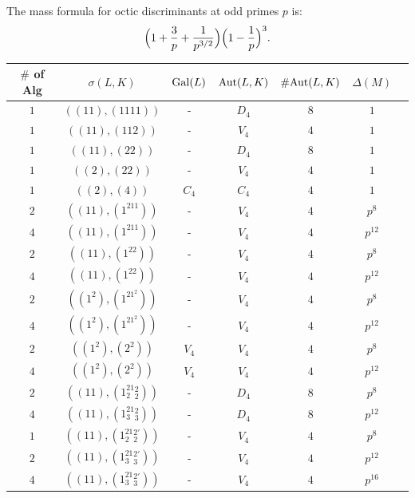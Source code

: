 \documentclass[10pt]{article}
\theoremstyle{plain}
\theoremstyle{definition}
\theoremstyle{remark}
\DeclareMathOperator{\Aut}{Aut}
\def\Gal{{\rm Gal}}
\def\Aut{{\rm Aut}}
\begin{document}
The mass formula for
octic discriminants at odd primes $p$
is:
\begin{equation*}
\Bigl(1+\frac{3}{p}+\frac{1}{p^{3/2}}\Bigr)\Bigl(1-\frac{1}{p}\Bigr)^3.
\end{equation*}
\begin{table}
\centering
\begin{tabular}{|c|c|c|c|c|c|c|}
\hline
$\#$ of Alg & $\sigma(L,K)$ & $\Gal(L)$ &  $\Aut(L,K)$ &
$\#\Aut(L,K)$ & $\Delta(M)$ \\
\hline
$1$ & $((11),(1111))$ & -   &  $D_4$  & $8$ & $1$ \\
$1$ & $((11),(112))$  & -   &  $V_4$  & $4$ & $1$ \\
$1$ & $((11),(22))$   & -   &  $D_4$  & $8$ & $1$ \\
$1$ & $((2),(22))$    & -   &  $V_4$  & $4$ & $1$ \\
$1$ & $((2),(4))$     & $C_4$ &  $C_4$  & $4$ & $1$  \\
\hline
$2$ & $((11),(1^211))$   & -   & $V_4$  & $4$ & $p^8$ \\
$4$ & $((11),(1^211))$   & -   & $V_4$  & $4$ & $p^{12}$ \\

$2$ & $((11),(1^22))$    & -   & $V_4$  & $4$ & $p^8$ \\
$4$ & $((11),(1^22))$    & -   & $V_4$  & $4$ & $p^{12}$ \\

$2$ & $((1^2),(1^21^2))$ & -   & $V_4$  & $4$ & $p^8$ \\
$4$ & $((1^2),(1^21^2))$ & -   & $V_4$  & $4$ & $p^{12}$ \\

$2$ & $((1^2),(2^2))$    & $V_4$   & $V_4$  & $4$ & $p^8$ \\
$4$ & $((1^2),(2^2))$    & $V_4$   & $V_4$  & $4$ & $p^{12}$ \\
\hline\hline
$2$ & $((11),(1_2^21_2^2))$  & -   & $D_4$  & $8$ & $p^8$ \\
$4$ & $((11),(1_3^21_3^2))$  & -   & $D_4$  & $8$ & $p^{12}$ \\

$1$ & $((11),(1_2^21_2^{2'}))$  & -   & $V_4$  & $4$ & $p^8$ \\
$2$ & $((11),(1_3^21_3^{2'}))$  & -   & $V_4$  & $4$ & $p^{12}$\\
$4$ & $((11),(1_3^21_3^{2'}))$  & -   & $V_4$  & $4$ & $p^{16}$\\


\end{tabular}
\end{table}
\end{document}

